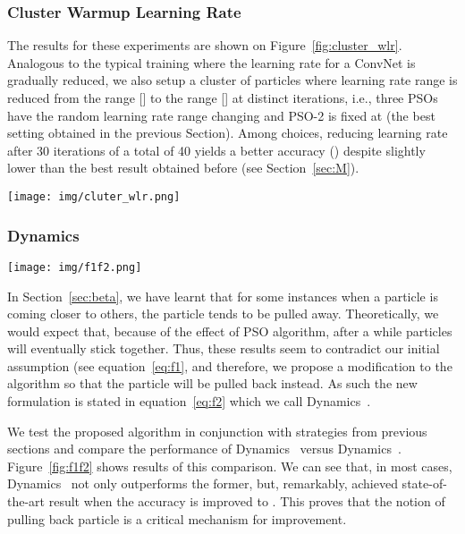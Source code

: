 \documentclass{ieeeaccess}
\begin{document}
\subsubsection{Cluster Warmup Learning Rate}
The results for these experiments are shown on Figure~\ref{fig:cluster_wlr}. Analogous to the typical training where the learning rate for a ConvNet is gradually reduced, we also setup a cluster of particles where learning rate range is reduced from the range [] to the range [] at distinct iterations, i.e., three PSOs have the random learning rate range changing and PSO-2 is fixed at  (the best setting obtained in the previous Section). Among choices, reducing learning rate after 30 iterations of a total of 40 yields a better accuracy () despite slightly lower than the best result obtained before (see Section~\ref{sec:M}).
\begin{figure*}[htb!]
\begin{center}
\texttt{[image: img/cluter\_wlr.png]}
\caption{Results for cluster warmup learning rates.}
\label{fig:cluster_wlr}
\end{center}
\end{figure*}
\subsubsection{Dynamics~}
\label{sec:d2}
\begin{figure*}[htb!]
\begin{center}
\texttt{[image: img/f1f2.png]}
\caption{Comparison of accuracy performance between Dynamics~ and Dynamics~. The latter outperforms the former and the best accuracy is further improved.}
\label{fig:f1f2}
\end{center}
\end{figure*}
In Section~\ref{sec:beta}, we have learnt that for some instances when a particle is coming closer to others, the particle tends to be pulled away. Theoretically, we would expect that, because of the effect of PSO algorithm, after a while particles will eventually stick together. Thus, these results seem to contradict our initial assumption (see equation~\eqref{eq:f1}, and therefore, we propose a modification to the algorithm so that the particle will be pulled back instead. As such the new formulation is stated in equation~\eqref{eq:f2} which we call Dynamics~. 

We test the proposed algorithm in conjunction with strategies from previous sections and compare the performance of Dynamics~ versus Dynamics~. Figure~\ref{fig:f1f2} shows results of this comparison. We can see that, in most cases, Dynamics~ not only outperforms the former, but, remarkably, achieved state-of-the-art result when the accuracy is improved to . This proves that the notion of pulling back particle is a critical mechanism for improvement.
\end{document}
